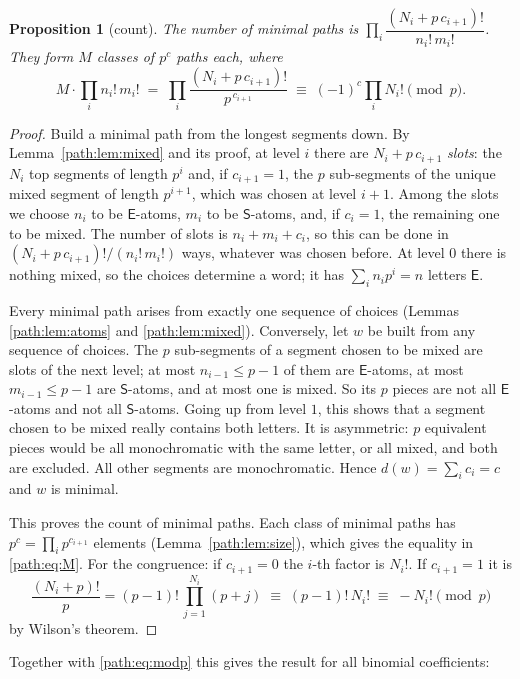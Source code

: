 \documentclass[11pt]{article}
\newtheorem{proposition}[theorem]{Proposition}
\theoremstyle{definition}
\theoremstyle{remark}
\numberwithin{equation}{section}
\numberwithin{figure}{section}
\newcommand{\E}{\textsf{E}}
\newcommand{\Ss}{\textsf{S}}
\begin{document}
\begin{proposition}[count]\label{path:prop:count}
The number of minimal paths is $\prod_i\dfrac{(N_i+p\,c_{i+1})!}{n_i!\,m_i!}$. They form $M$ classes of $p^c$
paths each, where
\begin{equation}\label{path:eq:M}
M\cdot\prod_i n_i!\,m_i!\;=\;\prod_i\frac{(N_i+p\,c_{i+1})!}{p^{\,c_{i+1}}}\;\equiv\;(-1)^c\prod_iN_i!\pmod p .
\end{equation}
\end{proposition}
\begin{proof}
Build a minimal path from the longest segments down. By Lemma~\ref{path:lem:mixed} and its proof, at level $i$ there are
$N_i+p\,c_{i+1}$ \emph{slots}: the $N_i$ top segments of length $p^i$ and, if $c_{i+1}=1$, the $p$ sub-segments of
the unique mixed segment of length $p^{i+1}$, which was chosen at level $i+1$. Among the slots we choose $n_i$
to be $\E$-atoms, $m_i$ to be $\Ss$-atoms, and, if $c_i=1$, the remaining one to be mixed. The number of slots is
$n_i+m_i+c_i$, so this can be done in $(N_i+p\,c_{i+1})!/(n_i!\,m_i!)$ ways, whatever was chosen before.
At level $0$ there is nothing mixed, so the choices determine a word; it has $\sum_in_ip^i=n$ letters $\E$.

Every minimal path arises from exactly one sequence of choices (Lemmas \ref{path:lem:atoms} and \ref{path:lem:mixed}).
Conversely, let $w$ be built from any sequence of choices. The $p$ sub-segments of a segment chosen to be mixed
are slots of the next level; at most $n_{i-1}\le p-1$ of them are $\E$-atoms, at most $m_{i-1}\le p-1$ are
$\Ss$-atoms, and at most one is mixed. So its $p$ pieces are not all $\E$-atoms and not all $\Ss$-atoms. Going up from level $1$, this shows that a
segment chosen to be mixed really contains both letters. It is asymmetric: $p$ equivalent pieces
would be all monochromatic with the same letter, or all mixed, and both are excluded. All other segments are
monochromatic. Hence
$d(w)=\sum_ic_i=c$ and $w$ is minimal.

This proves the count of minimal paths. Each class of minimal paths has $p^c=\prod_ip^{c_{i+1}}$ elements
(Lemma~\ref{path:lem:size}), which gives the equality in \eqref{path:eq:M}. For the congruence: if $c_{i+1}=0$ the $i$-th
factor is $N_i!$. If $c_{i+1}=1$ it is
\[
\frac{(N_i+p)!}{p}=(p-1)!\,\prod_{j=1}^{N_i}(p+j)\;\equiv\;(p-1)!\,N_i!\;\equiv\;-N_i!\pmod p
\]
by Wilson's theorem.
\end{proof}

Together with \eqref{path:eq:modp} this gives the result for all binomial coefficients:
\end{document}
